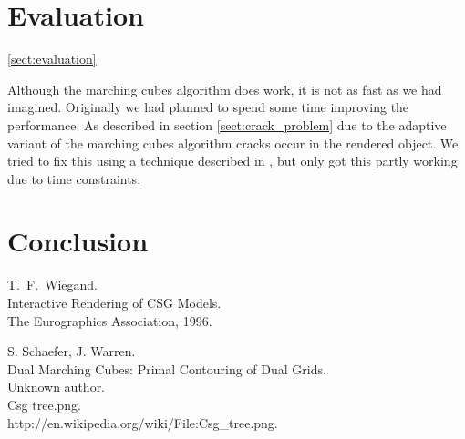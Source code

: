 \documentclass[a4paper,10pt,twocolumn]{article}
\begin{document}
\section{Evaluation}
\ref{sect:evaluation}

Although the marching cubes algorithm does work, it is not as fast as we had imagined. Originally we had planned to spend some time improving the performance. As described in section \ref{sect:crack_problem} due to the adaptive variant of the marching cubes algorithm cracks occur in the rendered object. We tried to fix this using a technique described in \cite{DMC}, but only got this partly working due to time constraints.

\section{Conclusion}


\begin{thebibliography}{99}
    T.~F.~Wiegand.\\
    Interactive Rendering of CSG Models.\\
    The Eurographics Association, 1996.

    S. Schaefer, J. Warren. \\
    Dual Marching Cubes: Primal Contouring of Dual Grids. \\

    Unknown author.\\
    Csg tree.png.\\
    http://en.wikipedia.org/wiki/File:Csg\_tree.png.\\
\end{thebibliography}
\end{document}
